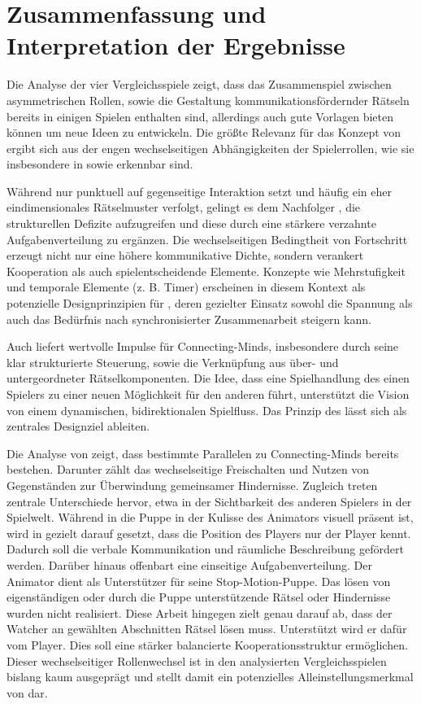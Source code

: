 \section{Zusammenfassung und Interpretation der Ergebnisse}
Die Analyse der vier Vergleichsspiele zeigt, dass das Zusammenspiel zwischen asymmetrischen Rollen, sowie die Gestaltung kommunikationsfördernder Rätseln  bereits in einigen Spielen enthalten sind, allerdings auch gute Vorlagen bieten können um neue Ideen zu entwickeln.
Die größte Relevanz für das Konzept von  ergibt sich aus der engen wechselseitigen Abhängigkeiten der Spielerrollen, wie sie insbesondere in  sowie  erkennbar sind.

Während  nur punktuell auf gegenseitige Interaktion setzt und häufig ein eher eindimensionales Rätselmuster verfolgt, gelingt es dem Nachfolger , die strukturellen Defizite aufzugreifen und diese durch eine stärkere verzahnte Aufgabenverteilung zu ergänzen. Die wechselseitigen Bedingtheit von Fortschritt erzeugt nicht nur eine höhere kommunikative Dichte, sondern verankert Kooperation als auch spielentscheidende Elemente. Konzepte wie Mehrstufigkeit und temporale Elemente (z. B. Timer) erscheinen in diesem Kontext als potenzielle Designprinzipien für , deren gezielter Einsatz sowohl die Spannung als auch das Bedürfnis nach synchronisierter Zusammenarbeit steigern kann.

Auch  liefert wertvolle Impulse für Connecting-Minds, insbesondere durch seine klar strukturierte Steuerung, sowie die Verknüpfung aus über- und untergeordneter Rätselkomponenten. Die Idee, dass eine Spielhandlung des einen Spielers zu einer neuen Möglichkeit für den anderen führt, unterstützt die Vision von einem dynamischen, bidirektionalen Spielfluss. Das Prinzip des  lässt sich als zentrales Designziel ableiten.

Die Analyse von  zeigt, dass bestimmte Parallelen zu Connecting-Minds bereits bestehen. Darunter zählt das wechselseitige Freischalten und Nutzen von Gegenständen zur Überwindung gemeinsamer Hindernisse. Zugleich treten zentrale Unterschiede hervor, etwa in der Sichtbarkeit des anderen Spielers in der Spielwelt. Während in  die Puppe in der Kulisse des Animators visuell präsent ist, wird in  gezielt darauf gesetzt, dass die Position des Players nur der Player kennt. Dadurch soll die verbale Kommunikation und räumliche Beschreibung gefördert werden.
Darüber hinaus offenbart  eine einseitige Aufgabenverteilung. Der Animator dient als Unterstützer für seine Stop-Motion-Puppe. Das lösen von eigenständigen oder durch die Puppe unterstützende Rätsel oder Hindernisse wurden nicht realisiert. Diese Arbeit hingegen zielt genau darauf ab, dass der Watcher an gewählten Abschnitten Rätsel lösen muss. Unterstützt wird er dafür vom Player. Dies soll eine stärker balancierte Kooperationsstruktur ermöglichen. Dieser wechselseitiger Rollenwechsel ist in den analysierten Vergleichsspielen bislang kaum ausgeprägt und stellt damit ein potenzielles Alleinstellungsmerkmal von  dar.

